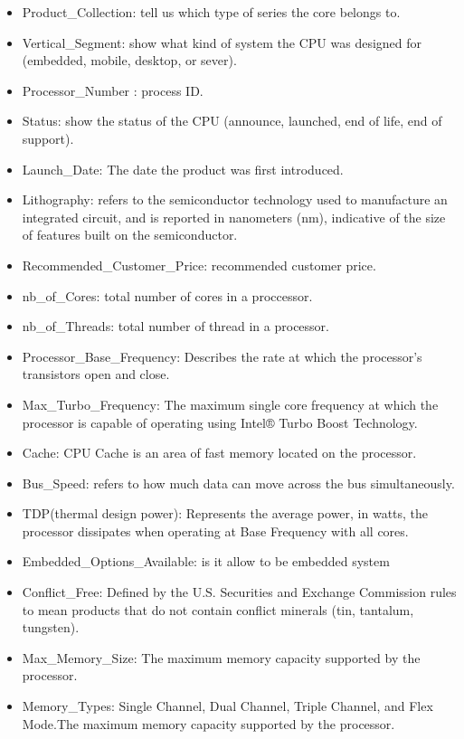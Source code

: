 \begin{itemize}
    \item Product\_Collection: tell us which type of series the core belongs to.
    \item Vertical\_Segment: show what kind of system the CPU was designed for (embedded, mobile, desktop, or sever).
    \item Processor\_Number	: process ID.
    \item Status: show the status of the CPU (announce, launched, end of life, end of support).
    \item Launch\_Date: The date the product was first introduced. 
    \item Lithography: refers to the semiconductor technology used to manufacture an integrated circuit, and is reported in nanometers (nm), indicative of the size of features built on the semiconductor. 
    \item Recommended\_Customer\_Price: recommended customer price. 
    \item nb\_of\_Cores: total number of cores in a proccessor. 
    \item nb\_of\_Threads: total number of thread in a processor. 
    \item Processor\_Base\_Frequency: Describes the rate at which the processor's transistors open and close.
    \item Max\_Turbo\_Frequency: The maximum single core frequency at which the processor is capable of operating using Intel® Turbo Boost Technology. 
    \item Cache: CPU Cache is an area of fast memory located on the processor. 
    \item Bus\_Speed: refers to how much data can move across the bus simultaneously.
    \item TDP(thermal design power): Represents the average power, in watts, the processor dissipates when operating at Base Frequency with all cores. 
    \item Embedded\_Options\_Available: is it allow to be embedded system
    \item Conflict\_Free: Defined by the U.S. Securities and Exchange Commission rules to mean products that do not contain conflict minerals (tin, tantalum, tungsten).
    \item Max\_Memory\_Size: The maximum memory capacity supported by the processor. 
    \item Memory\_Types: Single Channel, Dual Channel, Triple Channel, and Flex Mode.The maximum memory capacity supported by the processor.

\end{itemize}
